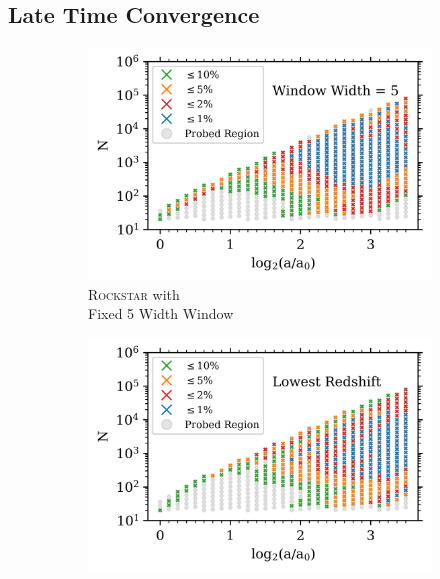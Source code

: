 \subsection{Late Time Convergence}\label{low_z_convergence}
\begin{figure}
\centering
\begin{subfigure}{.49\textwidth}
\centering
\includegraphics[width=\textwidth]{Ch3_Self_Sim/Appendix_Plots_gtr20/Rockstar_n15_mean_past_joyce_mah_M200c_gtr20_FW_WW5_N_vs_a_convergence_MT2_UVM_with_text_min_1000.png}
\caption{\textsc{Rockstar} with\\ Fixed 5 Width Window}
\end{subfigure}
\hfil
\begin{subfigure}{.49\textwidth}
\centering
\includegraphics[width=\textwidth]{Ch3_Self_Sim/Appendix_Plots_gtr20/Rockstar_n15_mean_past_joyce_mah_M200c_gtr20_LZ_N_vs_a_convergence_with_text_min_1000.png}

\end{subfigure}
\end{figure}
